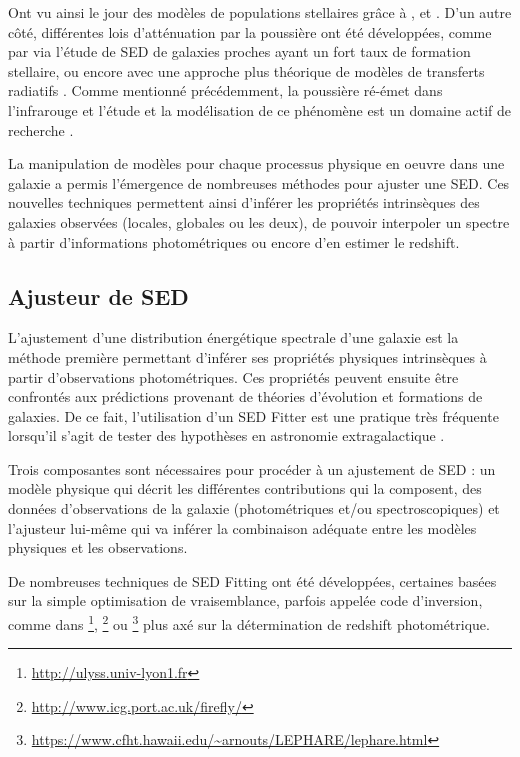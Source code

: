 \documentclass[../main/main.tex]{subfiles}
\begin{document}
Ont vu ainsi le jour des modèles de populations stellaires grâce à
\citet{Fioc1997}, \citet{BruzualCharlot2003} et \citet{Maraston2005}.
D'un autre côté, différentes lois d'atténuation par la poussière ont été
développées, comme par \citet{Calzetti1994,Calzetti2000} via l'étude de SED de
galaxies proches ayant un fort taux de formation stellaire, ou encore
avec une approche plus théorique de modèles de transferts radiatifs
\citep{WittGordon}.
Comme mentionné précédemment, la poussière ré-émet dans l'infrarouge et
l'étude et la modélisation de ce phénomène est un domaine actif de
recherche \citep{CharyElbaz, Draine2007,Casey2012, Dale2014, Leja2017}.

La manipulation de modèles pour chaque processus physique en oeuvre dans
une galaxie a permis l'émergence de nombreuses méthodes pour ajuster une
SED. Ces nouvelles techniques permettent ainsi d'inférer les propriétés intrinsèques des galaxies
observées (locales, globales ou les deux), de pouvoir interpoler un
spectre à partir d'informations photométriques ou encore d'en estimer le
redshift.

\subsection{Ajusteur de SED}

L'ajustement d'une distribution énergétique spectrale d'une galaxie est la
méthode première permettant d'inférer ses propriétés physiques intrinsèques à
partir d'observations photométriques. Ces propriétés peuvent ensuite être confrontés
aux prédictions provenant de théories d'évolution et formations de
galaxies. De ce fait, l'utilisation d'un SED Fitter est une pratique très
fréquente
lorsqu'il s'agit de tester des hypothèses en astronomie extragalactique
\citep{Tinsley1980, Walcher2011, Conroy2013, Chevallard2016, Briday22}. 

Trois composantes sont nécessaires pour procéder à un ajustement de SED : un
modèle physique qui décrit les différentes contributions qui la
composent, des données d'observations de la galaxie (photométriques
et/ou spectroscopiques) et l'ajusteur lui-même qui va inférer la
combinaison adéquate entre les modèles physiques et les observations.

De nombreuses techniques de SED Fitting ont été développées, certaines
basées sur 
la simple optimisation de vraisemblance, parfois appelée code
d'inversion, comme dans \footnote{\url{http://ulyss.univ-lyon1.fr}}\citep{KolevaUlyss}, \footnote{\url{http://www.icg.port.ac.uk/firefly/}}
\citep{WilkinsonFirefly} ou \footnote{\url{https://www.cfht.hawaii.edu/~arnouts/LEPHARE/lephare.html}} \citep{ArnoutsLephare} plus
axé sur la détermination de redshift photométrique.
\end{document}
